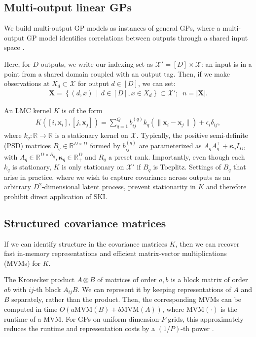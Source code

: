 \documentclass{article}
\def\bsk{{\boldsymbol\kappa}}
\def \R {\mathbb{R}}
\def\Tx{\textbf{x}}
\def\TX{\textbf{X}}
\newcommand{\set}[2]{ \left\{ #1 \,\middle|\, #2 \right\} }
\newcommand{\card}[1]{\left\vert{#1}\right\vert}
\newcommand{\norm}[1]{\mathopen\| #1 \mathclose\|}%
\def \mcX {\mathcal{X}}
\begin{document}
\subsection{Multi-output linear GPs}

We build multi-output GP models as instances of general GPs, where a multi-output GP model identifies correlations between outputs through a shared input space \cite{alvarez2011kernels}.

Here, for $D$ outputs, we write our indexing set as $\mcX'=[D]\times \mcX$: an input is in a point from a shared domain coupled with an output tag. Then, if we make observations at $X_d\subset\mcX$ for output $d\in[D]$, we can set:
\begin{align*}
\TX=\set{(d, x)}{d\in[D],x\in X_d}\subset{\mcX'};\;\; n=\card{\TX}.
\end{align*}

An LMC kernel $K$ is of the form 
\begin{align}
K([i,\Tx_i],[j,\Tx_j])=\sum_{q=1}^Qb_{ij}^{(q)}k_q(\norm{\Tx_i-\Tx_j})+\epsilon_i\delta_{ij},\label{lmcpointwise}
\end{align} 
where $k_q:\R\rightarrow\R$ is a stationary kernel on $\mcX$. Typically, the positive semi-definite (PSD) matrices $B_q\in\R^{D\times D}$ formed by $b_{ij}^{(q)}$ are parameterized as $A_qA_q^\top+\bsk_q I_D$, with $A_q\in\R^{D\times R_q},\bsk_q\in\R_+^D$ and $R_q$ a preset rank. Importantly, even though each $k_q$ is stationary, $K$ is only stationary on $\mcX'$ if $B_q$ is Toeplitz. Settings of $B_q$ that arise in practice, where we wish to capture covariance across outputs as an arbitrary $D^2$-dimensional latent process,  prevent stationarity in $K$ and therefore prohibit direct application of SKI.

\subsection{Structured covariance matrices}

If we can identify structure in the covariance matrices $K$, then we can recover fast in-memory representations and efficient matrix-vector multiplications (MVMs) for $K$.

The Kronecker product $A\otimes B$ of matrices of order $a,b$ is a block matrix of order $ab$ with $ij$-th block $A_{ij}B$. We can represent it by keeping representations of $A$ and $B$ separately, rather than the product. Then, the corresponding MVMs can be computed in time $O(a\text{MVM}(B)+b\text{MVM}(A))$, where $\text{MVM}(\cdot)$ is the runtime of a MVM. For GPs on uniform dimension-$P$ grids, this approximately reduces the runtime and representation costs by a $(1/P)$-th power \cite{gilboa2015scaling}.
\end{document}

